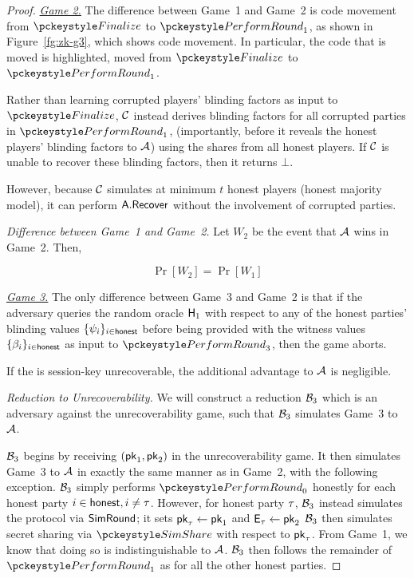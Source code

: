 \begin{proof}
\noindent \textit{\underline{Game 2.}}
The difference between Game~1 and Game~2 is code movement from
$\finalize$ to $\dkgkeygen_1$,
as shown in Figure~\ref{fg:zk-g3},
which shows code movement.
In particular, the code that is moved is highlighted,
moved from $\finalize$ to $\dkgkeygen_1$.

Rather than learning corrupted players' blinding factors as input to $\finalize$,
$\mathcal{C}$ instead derives blinding factors for all corrupted parties in $\dkgkeygen_1$,
(importantly, before it reveals the honest players' blinding factors to $\mathcal{A}$)
using the shares from all honest players.
If $\mathcal{C}$ is unable to recover these blinding factors,
then it returns $\bot$.

However, because $\mathcal{C}$ simulates at minimum $t$ honest players (honest majority model),
it can perform $\mathsf{A}.\mathsf{Recover}$ without the involvement of corrupted parties.


\medskip

\noindent \textit{Difference between Game~1 and Game~2.}
Let $W_2$ be the event that $\mathcal{A}$ wins in Game~2. Then,

\begin{equation} \label{eq:game3-zk}
  \Pr[W_2] = \Pr[W_1]
\end{equation}




\medskip

\noindent \textit{\underline{Game 3.}}
The only difference between Game~3 and Game~2 is that if the adversary
queries the random oracle $\mathsf{H}_1$ with respect to any of the honest
parties' blinding values $\{\psi_i \}_{i \in \mathsf{honest}}$
before being provided with the witness values
$\{ \beta_i\}_{i \in \mathsf{honest}}$ as input to $\dkgkeygen_3$,
then the game aborts.

If the \ENIKE is session-key unrecoverable,
the additional advantage to $\mathcal{A}$ is negligible.

\medskip

\noindent \textit{Reduction to \ENIKE Unrecoverability.}
We will construct a reduction $\mathcal{B}_3$ which is an adversary against the \ENIKE
unrecoverability game, such that $\mathcal{B}_3$ simulates Game~3 to $\mathcal{A}$.

$\mathcal{B}_3$ begins by receiving $(\mathsf{pk}_1,\mathsf{pk}_2)$ in the \ENIKE unrecoverability game.
It then simulates Game~3 to $\mathcal{A}$ in exactly the same manner as in Game~2,
with the following exception.
$\mathcal{B}_3$ simply performs $\dkgkeygen_0$ honestly for each honest party $i \in \mathsf{honest}, i \neq \tau$.
However, for honest party
$\tau$, $\mathcal{B}_3$ instead simulates the protocol via $\mathsf{SimRound}$;
it sets $\mathsf{pk}_\tau \gets \mathsf{pk}_1$ and $\mathsf{E}_\tau \gets \mathsf{pk}_2$
$\mathcal{B}_3$ then simulates secret sharing via $\simshare$ with respect to $\mathsf{pk}_\tau$.
From Game~1, we know that doing so is indistinguishable to $\mathcal{A}$.
$\mathcal{B}_3$ then follows the remainder of $\dkgkeygen_1$ as for all the other honest parties.


\end{proof}
